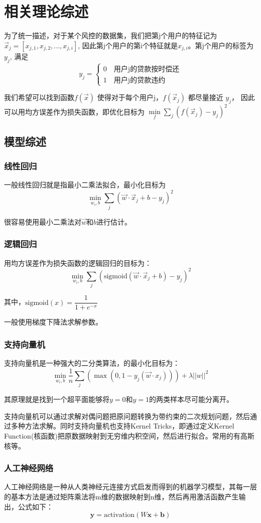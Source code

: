 \chapter{相关理论综述}
为了统一描述，对于某个风控的数据集，我们把第j个用户的特征记为$\vec x_j = [x_{j,1}, x_{j,2}, ..., x_{j,i}]$, 因此第j个用户的第i个特征就是$x_{j,i}$。第j个用户的标签为$y_j$, 满足
\[
y_j =\begin{cases}  0 \quad \text{用户j的贷款按时偿还} \\ 1 \quad \text{用户j的贷款违约} \end{cases}
\]

我们希望可以找到函数$f(\vec x)$ 使得对于每个用户j，$f(\vec x_j)$ 都尽量接近 $y_j$， 因此可以用均方误差作为损失函数，即优化目标为 $\min \limits_{f} \sum_j (f(\vec x_j) - y_j)^2$
\section{模型综述}
\subsection{线性回归}
一般线性回归就是指最小二乘法拟合，最小化目标为
\[\min \limits_{w_i, b} \sum_{j} (\vec w \cdot \vec x_j + b - y_j)^2\]
 
很容易使用最小二乘法对$\vec w$和$b$进行估计。
\subsection{逻辑回归}
用均方误差作为损失函数的逻辑回归的目标为：
\[\min \limits_{w_i, b} \sum_{j} (\text{sigmoid} ( \vec w\cdot \vec x_j + b) - y_j)^2\]

其中，$ \text{sigmoid}(x) = \dfrac{1}{1+e^{-x}} $

一般使用梯度下降法求解参数。
\subsection{支持向量机}
支持向量机\cite{scholkopf2001svm}是一种强大的二分类算法，的最小化目标为：
\[ \min \limits_{w_i, b} \dfrac{1}{n} \sum_{j}(\max(0, 1-y_j(\vec w \cdot x_j))) + \lambda ||w||^2  \]

其原理就是找到一个超平面能够将$y=0$和$y=1$的两类样本尽可能分离开。

支持向量机可以通过求解对偶问题把原问题转换为带约束的二次规划问题，然后通过多种方法求解。同时支持向量机也支持Kernel Tricks，即通过定义Kernel Function(核函数)把原数据映射到无穷维内积空间，然后进行拟合。常用的有高斯核等。
\subsection{人工神经网络}
人工神经网络是一种从人类神经元连接方式启发而得到的机器学习模型，其每一层的基本方法是通过矩阵乘法将m维的数据映射到n维，然后再用激活函数产生输出，公式如下：
\[ \bm{y} = \text{activation}(W\bm{x} + \bm{b}) \]

